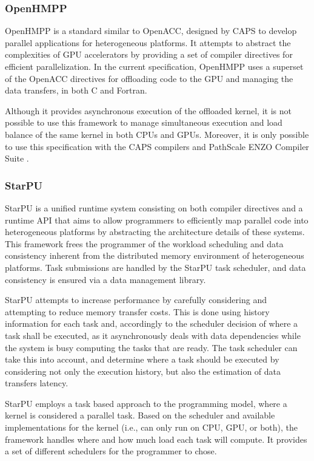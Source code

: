 \subsubsection*{OpenHMPP}

OpenHMPP \cite{OpenHMPP} is a standard similar to OpenACC, designed by CAPS \cite{CAPS} to develop parallel applications for heterogeneous platforms. It attempts to abstract the complexities of GPU accelerators by providing a set of compiler directives for efficient parallelization. In the current specification, OpenHMPP uses a superset of the OpenACC directives for offloading code to the GPU and managing the data transfers, in both C and Fortran.

Although it provides asynchronous execution of the offloaded kernel, it is not possible to use this framework to manage simultaneous execution and load balance of the same kernel in both CPUs and GPUs. Moreover, it is only possible to use this specification with the CAPS compilers and PathScale ENZO Compiler Suite \cite{ENZO}.

\subsubsection*{StarPU}

StarPU \cite{STARPU} is a unified runtime system consisting on both compiler directives and a runtime API that aims to allow programmers to efficiently map parallel code into heterogeneous platforms by abstracting the architecture details of these systems. This framework frees the programmer of the workload scheduling and data consistency inherent from the distributed memory environment of heterogeneous platforms. Task submissions are handled by the StarPU task scheduler, and data consistency is ensured via a data management library.

StarPU attempts to increase performance by carefully considering and attempting to reduce memory transfer costs. This is done using history information for each task and, accordingly to the scheduler decision of where a task shall be executed, as it asynchronously deals with data dependencies while the system is busy computing the tasks that are ready. The task scheduler can take this into account, and determine where a task should be executed by considering not only the execution history, but also the estimation of data transfers latency.

StarPU employs a task based approach to the programming model, where a kernel is considered a parallel task. Based on the scheduler and available implementations for the kernel (i.e., can only run on CPU, GPU, or both), the framework handles where and how much load each task will compute. It provides a set of different schedulers for the programmer to chose.

